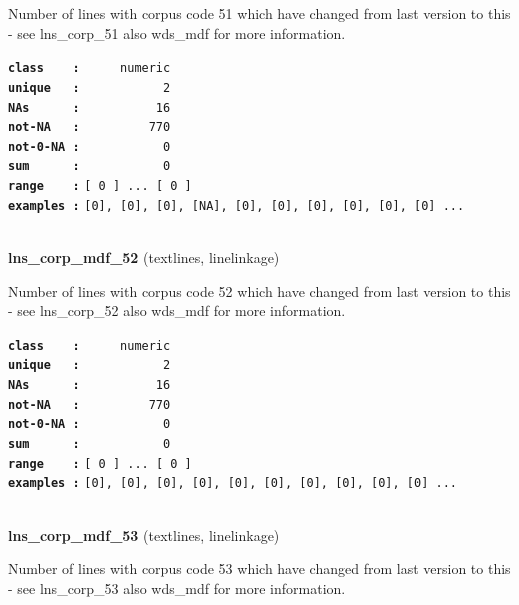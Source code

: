 \documentclass[]{article}
\begin{document}
Number of lines with corpus code 51 which have changed from last version
to this - see lns\_corp\_51 also wds\_mdf for more information.

\textbf{\texttt{class\ \ \ \ :}} \texttt{~~~~~numeric}\\
\textbf{\texttt{unique\ \ \ :}} \texttt{~~~~~~~~~~~2}\\
\textbf{\texttt{NAs\ \ \ \ \ \ :}} \texttt{~~~~~~~~~~16}\\
\textbf{\texttt{not-NA\ \ \ :}} \texttt{~~~~~~~~~770}\\
\textbf{\texttt{not-0-NA\ :}} \texttt{~~~~~~~~~~~0}\\
\textbf{\texttt{sum\ \ \ \ \ \ :}} \texttt{~~~~~~~~~~~0}\\
\textbf{\texttt{range\ \ \ \ :}}
\texttt{{[}\ 0\ {]}\ ...\ {[}\ 0\ {]}}\\
\textbf{\texttt{examples\ :}}
\texttt{{[}0{]},\ {[}0{]},\ {[}0{]},\ {[}NA{]},\ {[}0{]},\ {[}0{]},\ {[}0{]},\ {[}0{]},\ {[}0{]},\ {[}0{]}\ ...}\\

~

\textbf{lns\_corp\_mdf\_52} (textlines, linelinkage)

Number of lines with corpus code 52 which have changed from last version
to this - see lns\_corp\_52 also wds\_mdf for more information.

\textbf{\texttt{class\ \ \ \ :}} \texttt{~~~~~numeric}\\
\textbf{\texttt{unique\ \ \ :}} \texttt{~~~~~~~~~~~2}\\
\textbf{\texttt{NAs\ \ \ \ \ \ :}} \texttt{~~~~~~~~~~16}\\
\textbf{\texttt{not-NA\ \ \ :}} \texttt{~~~~~~~~~770}\\
\textbf{\texttt{not-0-NA\ :}} \texttt{~~~~~~~~~~~0}\\
\textbf{\texttt{sum\ \ \ \ \ \ :}} \texttt{~~~~~~~~~~~0}\\
\textbf{\texttt{range\ \ \ \ :}}
\texttt{{[}\ 0\ {]}\ ...\ {[}\ 0\ {]}}\\
\textbf{\texttt{examples\ :}}
\texttt{{[}0{]},\ {[}0{]},\ {[}0{]},\ {[}0{]},\ {[}0{]},\ {[}0{]},\ {[}0{]},\ {[}0{]},\ {[}0{]},\ {[}0{]}\ ...}\\

~

\textbf{lns\_corp\_mdf\_53} (textlines, linelinkage)

Number of lines with corpus code 53 which have changed from last version
to this - see lns\_corp\_53 also wds\_mdf for more information.
\end{document}

